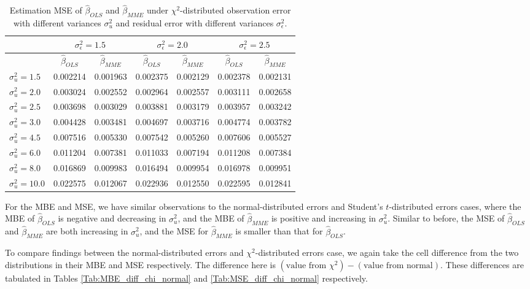 \documentclass{article}
\begin{document}
\begin{table}[ht]
    \centering
    \caption{Estimation MSE of $\hat{\beta}_{OLS}$ and $\hat{\beta}_{MME}$ under $\chi^2$-distributed observation error with different variances $\sigma^2_u$ and residual error with different variances $\sigma^2_\epsilon$.}
    \label{Tab:MSE_chi}
    \begin{tabular}[t]{lcccccc}
        \hline
        &\multicolumn{2}{c}{$\sigma^2_\epsilon=1.5$}&\multicolumn{2}{c}{$\sigma^2_\epsilon=2.0$}&\multicolumn{2}{c}{$\sigma^2_\epsilon=2.5$}\\
        \hline
        &$\hat{\beta}_{OLS}$&$\hat{\beta}_{MME}$&$\hat{\beta}_{OLS}$&$\hat{\beta}_{MME}$&$\hat{\beta}_{OLS}$&$\hat{\beta}_{MME}$\\
        \hline
        $\sigma^2_u = 1.5$&0.002214&0.001963&0.002375&0.002129&0.002378&0.002131\\
        $\sigma^2_u = 2.0$&0.003024&0.002552&0.002964&0.002557&0.003111&0.002658\\
        $\sigma^2_u = 2.5$&0.003698&0.003029&0.003881&0.003179&0.003957&0.003242\\
        $\sigma^2_u = 3.0$&0.004428&0.003481&0.004697&0.003716&0.004774&0.003782\\
        $\sigma^2_u = 4.5$&0.007516&0.005330&0.007542&0.005260&0.007606&0.005527\\
        $\sigma^2_u = 6.0$&0.011204&0.007381&0.011033&0.007194&0.011208&0.007384\\
        $\sigma^2_u = 8.0$&0.016869&0.009983&0.016494&0.009954&0.016978&0.009951\\
        $\sigma^2_u = 10.0$&0.022575&0.012067&0.022936&0.012550&0.022595&0.012841\\
        \hline
    \end{tabular}
\end{table}

For the MBE and MSE, we have similar observations to the normal-distributed errors and Student's $t$-distributed errors cases,
where the MBE of $\hat{\beta}_{OLS}$ is negative and decreasing in $\sigma^2_u$, 
and the MBE of $\hat{\beta}_{MME}$ is positive and increasing in $\sigma^2_u$.
Similar to before, the MSE of $\hat{\beta}_{OLS}$ and $\hat{\beta}_{MME}$ are both increasing in $\sigma^2_u$,
and the MSE for $\hat{\beta}_{MME}$ is smaller than that for $\hat{\beta}_{OLS}$.

To compare findings between the normal-distributed errors and $\chi^2$-distributed errors case,
we again take the cell difference from the two distributions in their MBE and MSE respectively.
The difference here is $(\textrm{value from } \chi^2) - (\textrm{value from normal})$. 
These differences are tabulated in Tables \ref{Tab:MBE_diff_chi_normal} and \ref{Tab:MSE_diff_chi_normal} respectively.
\end{document}
